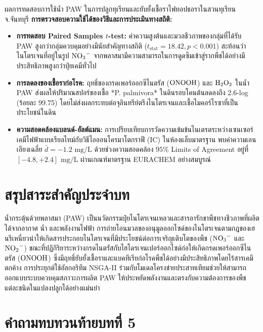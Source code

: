\begin{agribox}{ผลการทดสอบการใช้น้ำ PAW ในการปลูกทุเรียนและยับยั้งเชื้อราไฟทอปธอราในสวนทุเรียน จ.จันทบุรี}
\textbf{การตรวจสอบความใช้ได้ของวิธีและการประเมินทางสถิติ:}
\begin{itemize}
    \item \textbf{การทดสอบ Paired Samples $t$-test:} ค่าความสูงต้นและมวลชีวภาพของกลุ่มที่ได้รับ PAW สูงกว่ากลุ่มควบคุมอย่างมีนัยสำคัญทางสถิติ ($t_{\text{stat}} = 18.42, p < 0.001$) สะท้อนว่าไนโตรเจนที่อยู่ในรูป $\ce{NO3-}$ จากพลาสมามีความสามารถในการดูดซึมเข้าสู่รากพืชได้อย่างมีประสิทธิภาพสูงกว่าปุ๋ยเคมีทั่วไป
    \item \textbf{การลดลงของเชื้อราก่อโรค:} ฤทธิ์ของกรดเพอร์ออกซีไนตรัส ($\ce{ONOOH}$) และ $\ce{H2O2}$ ในน้ำ PAW ส่งผลให้ปริมาณสปอร์ของเชื้อ *P. palmivora* ในดินรอบโคนต้นลดลงถึง 2.6-log (ร้อยละ 99.75) โดยไม่ส่งผลกระทบต่อจุลินทรีย์ตรึงไนโตรเจนและเชื้อไมคอร์ไรซาที่เป็นประโยชน์ในดิน
    \item \textbf{ความสอดคล้องแบลนด์-อัลต์แมน:} การเปรียบเทียบการวัดความเข้มข้นไนเตรตระหว่างเซนเซอร์เคมีไฟฟ้าแบบเรียลไทม์กับวิธีไอออนโครมาโตกราฟี (IC) ในห้องแล็บมาตรฐาน พบค่าความเอนเอียงเฉลี่ย $\bar{d} = -1.2 \text{ mg/L}$ ด้วยช่วงความสอดคล้อง $95\%$ Limits of Agreement อยู่ที่ $[-4.8, +2.4] \text{ mg/L}$ ผ่านเกณฑ์มาตรฐาน EURACHEM อย่างสมบูรณ์
\end{itemize}
\end{agribox}

\section{สรุปสาระสำคัญประจำบท}

น้ำกระตุ้นด้วยพลาสมา (PAW) เป็นนวัตกรรมปุ๋ยไนโตรเจนเหลวและสารอารักขาพืชทางชีวภาพที่ผลิตได้จากอากาศ น้ำ และพลังงานไฟฟ้า การถ่ายโอนมวลของอนุมูลออกไซด์ของไนโตรเจนตามกฎของเฮนรีเหนี่ยวนำให้เกิดสารประกอบไนโตรเจนที่มีประโยชน์ต่อการเจริญเติบโตของพืช ($\ce{NO3-}$ และ $\ce{NO2-}$) ขณะที่ปฏิกิริยาระหว่างกรดไนตรัสกับไฮโดรเจนเปอร์ออกไซด์ก่อให้เกิดกรดเพอร์ออกซีไนตรัส ($\ce{ONOOH}$) ซึ่งมีฤทธิ์ยับยั้งเชื้อราและแบคทีเรียก่อโรคพืชได้อย่างมีประสิทธิภาพโดยไร้สารเคมีตกค้าง การประยุกต์ใช้อัลกอริทึม NSGA-II ร่วมกับโมเดลโครงข่ายประสาทเทียมช่วยให้สามารถออกแบบระบบควบคุมสภาวะการผลิต PAW ให้ประหยัดพลังงานและตรงกับความต้องการของพืชแต่ละชนิดในแปลงปลูกได้อย่างแม่นยำ

\section{คำถามทบทวนท้ายบทที่ 5}


